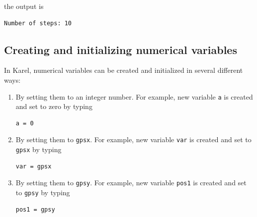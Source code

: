 \noindent
the output is\\

\begin{ybox}
\begin{verbatim}
Number of steps: 10
\end{verbatim}
\end{ybox}
\vspace{6mm}
\subsection[\ \ Creating and initializing numerical variables]{Creating and initializing numerical variables} \label{par:var}

In Karel, numerical variables can be created and initialized in several different ways: 
\begin{enumerate}
\item By setting them to an integer number. For example, new variable {\tt a} is created and set to zero by typing \\

\begin{bboxshort}
\begin{Verbatim}[commandchars=\\\{\}]
a = 0
\end{Verbatim}
\end{bboxshort}
\vspace{1mm}

\noindent
\item By setting them to {\tt gpsx}. For example, new variable {\tt var} is created and set to {\tt gpsx} by typing\\

\begin{bboxshort}
\begin{Verbatim}[commandchars=\\\{\}]
var = gpsx
\end{Verbatim}
\end{bboxshort}
\vspace{1mm}

\noindent
\item By setting them to {\tt gpsy}. For example, new variable {\tt pos1} is created and set to {\tt gpsy} by typing\\

\begin{bboxshort}
\begin{Verbatim}[commandchars=\\\{\}]
pos1 = gpsy
\end{Verbatim}
\end{bboxshort}
\vspace{1mm}


\end{enumerate}

